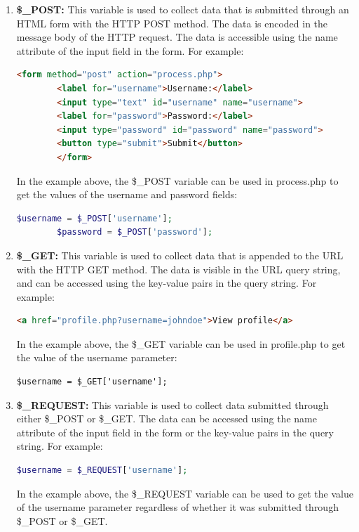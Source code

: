 \documentclass[11pt]{article}
\begin{document}
  \begin{enumerate}
    \item   \textbf{\$\_POST:} This variable is used to collect data that is submitted through an HTML form with the HTTP POST method. The data is encoded in the message body of the HTTP request. The data is accessible using the name attribute of the input field in the form. For example:
    \begin{lstlisting}[language=html, caption={form.html}]
        <form method="post" action="process.php">
        <label for="username">Username:</label>
        <input type="text" id="username" name="username">
        <label for="password">Password:</label>
        <input type="password" id="password" name="password">
        <button type="submit">Submit</button>
        </form>
    \end{lstlisting}
    In the example above, the \$\_POST variable can be used in process.php to get the values of the username and password fields:
    \begin{lstlisting}[language=php, caption={process.php}]
        $username = $_POST['username'];
        $password = $_POST['password'];
    \end{lstlisting}

    \item \textbf{\$\_GET:} This variable is used to collect data that is appended to the URL with the HTTP GET method. The data is visible in the URL query string, and can be accessed using the key-value pairs in the query string. For example:
    \begin{lstlisting}[language=html, caption={link.html}]
        <a href="profile.php?username=johndoe">View profile</a>
    \end{lstlisting}
    In the example above, the \$\_GET variable can be used in profile.php to get the value of the username parameter:
    \begin{lstlisting}[language=html, caption={profile.php}]
        $username = $_GET['username'];
    \end{lstlisting}

    \item \textbf{\$\_REQUEST:} This variable is used to collect data submitted through either \$\_POST or \$\_GET. The data can be accessed using the name attribute of the input field in the form or the key-value pairs in the query string. For example:
    \begin{lstlisting}[language=php, caption={process.php}]
        $username = $_REQUEST['username'];
    \end{lstlisting}

    In the example above, the \$\_REQUEST variable can be used to get the value of the username parameter regardless of whether it was submitted through \$\_POST or \$\_GET.

  \end{enumerate}
\end{document}
